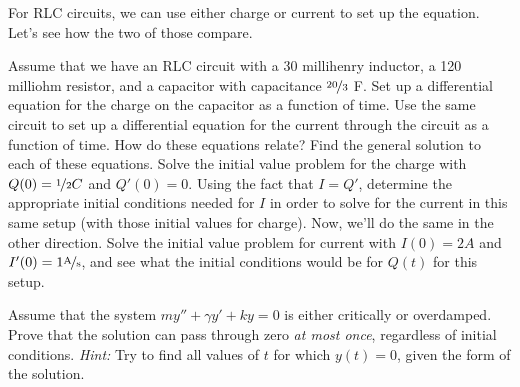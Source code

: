 \documentclass{ximera}
\begin{document}
\begin{exercise}
    For RLC circuits, we can use either charge or current to set up the equation. Let's see how the two of those compare.
    \begin{tasks}
        \task Assume that we have an RLC circuit with a 30 millihenry inductor, a 120 milliohm resistor, and a capacitor with capacitance $\nicefrac{20}{3}$ F. Set up a differential equation for the charge on the capacitor as a function of time.
        \task Use the same circuit to set up a differential equation for the current through the circuit as a function of time. How do these equations relate?
        \task Find the general solution to each of these equations. 
        \task Solve the initial value problem for the charge with $Q(0) = \nicefrac{1}{2} C$ and $Q'(0) = 0$.
        \task Using the fact that $I = Q'$, determine the appropriate initial conditions needed for $I$ in order to solve for the current in this same setup (with those initial values for charge).
        \task Now, we'll do the same in the other direction. Solve the initial value problem for current with $I(0) = 2 A$ and $I'(0) = 1 \unitfrac{A}{s}$, and see what the initial conditions would be for $Q(t)$ for this setup.    
    \end{tasks}
\end{exercise}

\begin{exercise}
Assume that the system $my'' + \gamma y' + ky = 0$ is either critically or overdamped. Prove that the solution can pass through zero \emph{at most once}, regardless of initial conditions. \emph{Hint:} Try to find all values of $t$ for which $y(t) = 0$, given the form of the solution.
\end{exercise}
%
\end{document}
